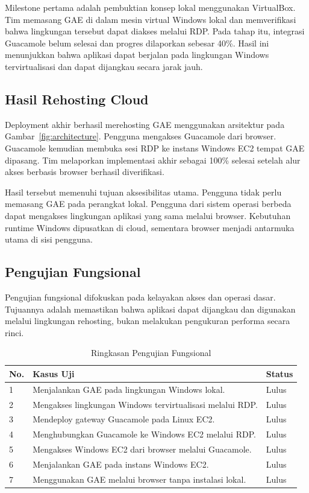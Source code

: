 \documentclass[conference]{IEEEtran}
\begin{document}
Milestone pertama adalah pembuktian konsep lokal menggunakan VirtualBox. Tim memasang GAE di dalam mesin virtual Windows lokal dan memverifikasi bahwa lingkungan tersebut dapat diakses melalui RDP. Pada tahap itu, integrasi Guacamole belum selesai dan progres dilaporkan sebesar 40\%. Hasil ini menunjukkan bahwa aplikasi dapat berjalan pada lingkungan Windows tervirtualisasi dan dapat dijangkau secara jarak jauh.

\subsection{Hasil Rehosting Cloud}

Deployment akhir berhasil merehosting GAE menggunakan arsitektur pada Gambar~\ref{fig:architecture}. Pengguna mengakses Guacamole dari browser. Guacamole kemudian membuka sesi RDP ke instans Windows EC2 tempat GAE dipasang. Tim melaporkan implementasi akhir sebagai 100\% selesai setelah alur akses berbasis browser berhasil diverifikasi.

Hasil tersebut memenuhi tujuan aksesibilitas utama. Pengguna tidak perlu memasang GAE pada perangkat lokal. Pengguna dari sistem operasi berbeda dapat mengakses lingkungan aplikasi yang sama melalui browser. Kebutuhan runtime Windows dipusatkan di cloud, sementara browser menjadi antarmuka utama di sisi pengguna.

\subsection{Pengujian Fungsional}

Pengujian fungsional difokuskan pada kelayakan akses dan operasi dasar. Tujuannya adalah memastikan bahwa aplikasi dapat dijangkau dan digunakan melalui lingkungan rehosting, bukan melakukan pengukuran performa secara rinci.

\begin{table}[!t]
\centering
\caption{Ringkasan Pengujian Fungsional}
\label{tab:testing}
\begin{tabularx}{\columnwidth}{p{0.45cm}X p{1.15cm}}
\toprule
\textbf{No.} & \textbf{Kasus Uji} & \textbf{Status} \\
\midrule
1 & Menjalankan GAE pada lingkungan Windows lokal. & Lulus \\
2 & Mengakses lingkungan Windows tervirtualisasi melalui RDP. & Lulus \\
3 & Mendeploy gateway Guacamole pada Linux EC2. & Lulus \\
4 & Menghubungkan Guacamole ke Windows EC2 melalui RDP. & Lulus \\
5 & Mengakses Windows EC2 dari browser melalui Guacamole. & Lulus \\
6 & Menjalankan GAE pada instans Windows EC2. & Lulus \\
7 & Menggunakan GAE melalui browser tanpa instalasi lokal. & Lulus \\
\bottomrule
\end{tabularx}
\end{table}
\end{document}
